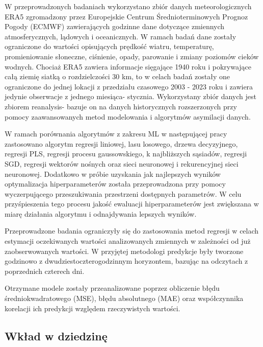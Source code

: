 W przeprowadzonych badaniach wykorzystano zbiór danych meteorologicznych ERA5
zgromadzony przez Europejskie Centrum Średnioterminowych Prognoz Pogody (ECMWF)
zawierających godzinne dane dotyczące zmiennych atmosferycznych, lądowych i
oceanicznych. W ramach badań dane zostały ograniczone do wartości opisujących
prędkość wiatru, temperaturę, promieniowanie słoneczne, ciśnienie, opady, parowanie i
zmiany poziomów cieków wodnych. Chociaż ERA5 zawiera informacje sięgające 1940
roku i pokrywające całą ziemię siatką o rozdzielczości 30 km, 
to w celach badań zostały one ograniczone do jednej lokacji z przedziału czasowego 
2003 - 2023 roku i zawiera jedynie obserwacje z jednego miesiąca- stycznia. 
Wykorzystany zbiór danych jest zbiorem reanalysis- bazuje on na 
danych historycznych rozszerzonych przy pomocy zaawansowanych metod modelowania i 
algorytmów asymilacji danych.

W ramach porównania algorytmów z zakresu ML w następującej pracy zastosowano
algorytm regresji liniowej, lasu losowego, drzewa decyzyjnego, regresji PLS, 
regresji procesu gaussowskiego, k najbliższych sąsiadów, regresji SGD, 
regresji wektorów nośnych oraz sieci neuronowej i rekurencyjnej sieci neuronowej. 
Dodatkowo w próbie uzyskania jak najlepszych wyników optymalizacja hiperparameterów
została przeprowadzona przy pomocy wyczerpującego przeszukiwania przestrzeni 
dostępnych parametrów. W celu przyśpieszenia tego procesu jakość ewaluacji 
hiperparameterów jest zwiększana w miarę działania algorytmu i odnajdywania lepszych
wyników.

Przeprowadzone badania ograniczyły się do zastosowania metod regresji w celach
estymacji oczekiwanych wartości analizowanych zmiennych w zależności
od już zaobserwowanych wartości. W przyjętej metodologi predykcje były tworzone
godzinowo z dwudziestoczterogodzinnym horyzontem, bazując na odczytach z poprzednich
czterech dni.

Otrzymane modele zostały przeanalizowane poprzez obliczenie błędu 
średniokwadratowego (MSE), błędu absolutnego (MAE) oraz współczynnika korelacji
ich predykcji względem rzeczywistych wartości.

\subsection{Wkład w dziedzinę}


